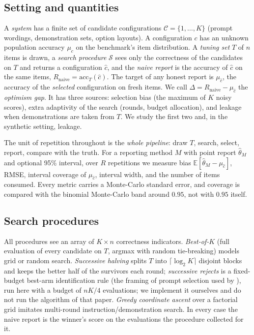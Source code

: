 \subsection{Setting and quantities}
A \emph{system} has a finite set of candidate configurations $\mathcal C=\{1,\dots,K\}$ (prompt wordings, demonstration sets, option layouts). A configuration $c$ has an unknown population accuracy $\mu_c$ on the benchmark's item distribution. A \emph{tuning set} $T$ of $n$ items is drawn, a \emph{search procedure} $\mathcal S$ sees only the correctness of the candidates on $T$ and returns a configuration $\hat c$, and the \emph{naive report} is the accuracy of $\hat c$ on the same items, $R_{\text{naive}}=\mathrm{acc}_T(\hat c)$. The target of any honest report is $\mu_{\hat c}$, the accuracy of the \emph{selected} configuration on fresh items. We call
$\Delta = R_{\text{naive}}-\mu_{\hat c}$ the \emph{optimism gap}. It has three sources: selection bias (the maximum of $K$ noisy scores), extra adaptivity of the search (rounds, budget allocation), and leakage when demonstrations are taken from $T$. We study the first two and, in the synthetic setting, leakage.

The unit of repetition throughout is the \emph{whole pipeline}: draw $T$, search, select, report, compare with the truth. For a reporting method $M$ with point report $\hat\theta_M$ and optional 95\% interval, over $R$ repetitions we measure bias $\mathbb E[\hat\theta_M-\mu_{\hat c}]$, RMSE, interval coverage of $\mu_{\hat c}$, interval width, and the number of items consumed. Every metric carries a Monte-Carlo standard error, and coverage is compared with the binomial Monte-Carlo band around $0.95$, not with $0.95$ itself.

\subsection{Search procedures}
All procedures see an array of $K\times n$ correctness indicators. \emph{Best-of-$K$} (full evaluation of every candidate on $T$, argmax with random tie-breaking) models grid or random search. \emph{Successive halving} splits $T$ into $\lceil\log_2K\rceil$ disjoint blocks and keeps the better half of the survivors each round; \emph{successive rejects} is a fixed-budget best-arm identification rule (the framing of prompt selection used by \citet{shi2024triple}), run here with a budget of $nK/4$ evaluations; we implement it ourselves and do not run the algorithm of that paper. \emph{Greedy coordinate ascent} over a factorial grid imitates multi-round instruction/demonstration search. In every case the naive report is the winner's score on the evaluations the procedure collected for it.

